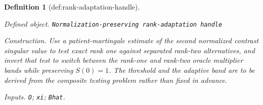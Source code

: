 \documentclass{article}
\newtheorem{definition}{Definition}
\begin{document}
\begin{definition}[def:rank-adaptation-handle]\label{def:rank-adaptation-handle}
\par\smallskip\noindent\emph{Defined object.} \texttt{Normalization-\allowbreak{}preserving rank-\allowbreak{}adaptation handle}
\par\smallskip\noindent\emph{Construction.} Use a patient-martingale estimate of the second normalized contrast singular value to test exact rank one against separated rank-two alternatives, and invert that test to switch between the rank-one and rank-two oracle multiplier bands while preserving \(S(0)=1\). The threshold and the adaptive band are to be derived from the composite testing problem rather than fixed in advance.
\par\smallskip\noindent\emph{Inputs.} \texttt{O}; \texttt{xi}; \texttt{Bhat}.
\end{definition}
\end{document}
